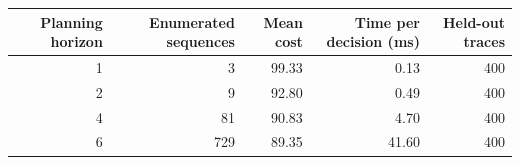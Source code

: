 \begin{tabular}{rrrrr}
\toprule
Planning horizon & Enumerated sequences & Mean cost & Time per decision (ms) & Held-out traces \\
\midrule
1 & 3 & 99.33 & 0.13 & 400 \\
2 & 9 & 92.80 & 0.49 & 400 \\
4 & 81 & 90.83 & 4.70 & 400 \\
6 & 729 & 89.35 & 41.60 & 400 \\
\bottomrule
\end{tabular}